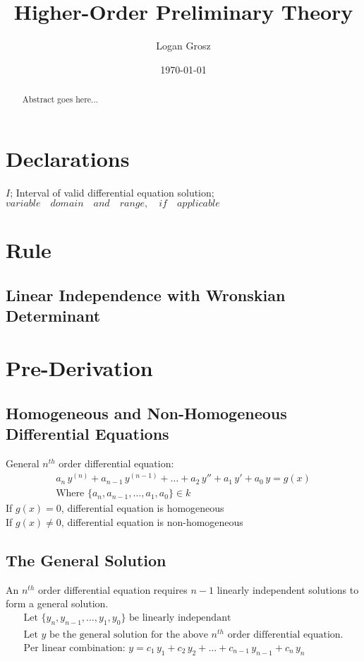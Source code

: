 \documentclass{article}
\begin{document}
	
\author{Logan Grosz}
\title{Higher-Order Preliminary Theory}
\date{\today}

\maketitle

\begin{abstract}
	Abstract goes here...
\end{abstract}

\section{Declarations}

$I$; Interval of valid differential equation solution; $variable\quad domain\quad and\quad range,\quad if\quad applicable$

\section{Rule}

	\subsection{Linear Independence with Wronskian Determinant}

\section{Pre-Derivation}
	\subsection{Homogeneous and Non-Homogeneous Differential Equations}
		General $n^{th}$ order differential equation:\\
			\begin{gather*}
				a_n\,y^{(n)}+a_{n-1}\,y^{(n-1)}+\dots+a_2\,y''+a_1\,y'+a_0\,y=g(x)\\
				\text{Where }\{a_n,a_{n-1},\dots,a_1,a_0\}\in k
			\end{gather*}
		If $g(x)=0$, differential equation is homogeneous\\
		If $g(x)\neq0$, differential equation is non-homogeneous\\
	\subsection{The General Solution}
		An $n^{th}$ order differential equation requires $n-1$ linearly independent solutions to form a general solution.
			\begin{gather*}
				\text{Let } \{y_n,y_{n-1},\dots,y_1,y_0\} \text{ be linearly independant}\\
				\text{Let } y \text{ be the general solution for the above } n^{th} \text{ order differential equation.}\\
				\text{Per linear combination: }y=c_1\,y_1+c_2\,y_2+\dots+c_{n-1}\,y_{n-1}+c_{n}\,y_n
			\end{gather*}
\end{document}
